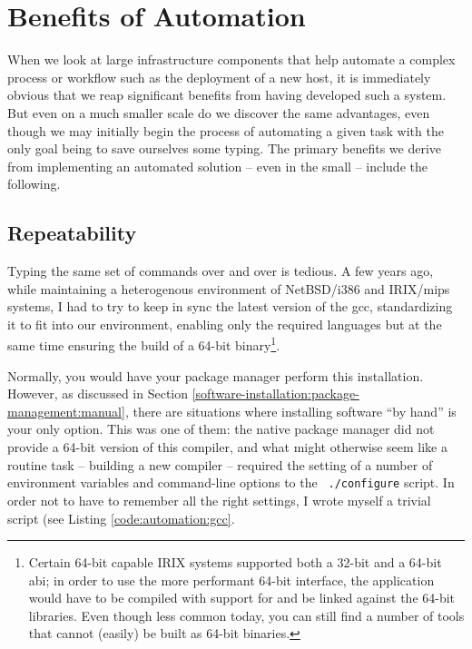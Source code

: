 \section{Benefits of Automation}
\label{automation:benefits}

When we look at large infrastructure components that
help automate a complex process or workflow such as
the deployment of a new host, it is immediately
obvious that we reap significant benefits from having
developed such a system.  But even on a much smaller
scale do we discover the same advantages, even though
we may initially begin the process of automating a
given task with the only goal being to save ourselves
some typing.  The primary benefits we derive from
implementing an automated solution -- even in the
small -- include the following.

\subsection{Repeatability}
\label{automation:benefits:repeatability}

Typing the same set of commands over and over is
tedious.  A few years ago, while maintaining a
heterogenous environment of NetBSD/i386 and IRIX/mips
systems, I had to try to keep in sync the latest
version of the \gls{gcc},
standardizing it to fit into our environment, enabling
only the required languages but at the same time
ensuring the build of a 64-bit binary\footnote{Certain
64-bit capable IRIX systems supported both a 32-bit
and a 64-bit \gls{abi}; in order to use the more performant 64-bit
interface, the application would have to be compiled
with support for and be linked against the 64-bit
libraries.  Even though less common today, you can
still find a number of tools that cannot (easily) be
built as 64-bit binaries.}.

Normally, you would have your package manager perform
this installation.  However, as discussed in Section
\ref{software-installation:package-management:manual},
there are situations where installing software ``by
hand'' is your only option.  This was one of them: the
native package manager did not provide a 64-bit
version of this compiler, and what might otherwise
seem like a routine task -- building a new compiler --
required the setting of a number of environment
variables and command-line options to the {\tt
./configure} script.  In order not to have to remember
all the right settings, I wrote myself a trivial
script (see Listing \ref{code:automation:gcc}.

